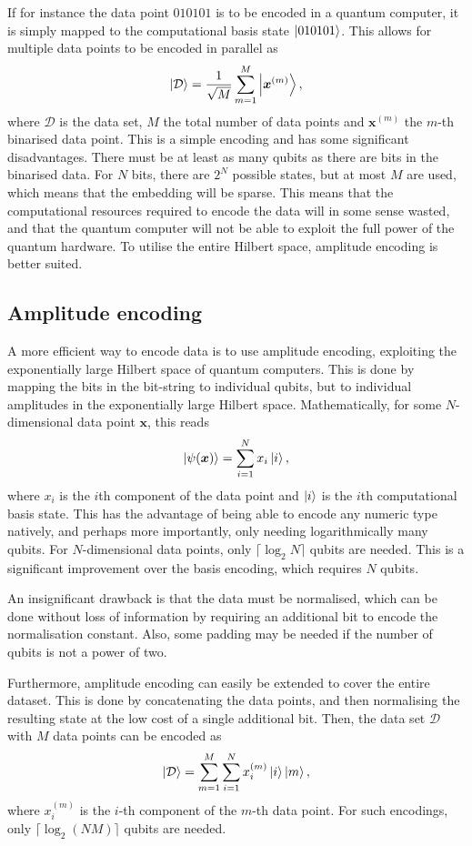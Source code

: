 If for instance the data point $010101$ is to be encoded in a quantum computer, it is simply mapped to the computational basis state $\ket{010101}$. This allows for multiple data points to be encoded in parallel as
\begin{equation}
    \ket{\mathcal{D}} = \frac{1}{\sqrt M} \sum_{m=1}^M \ket{\bm{x}^{(m)}},
\end{equation}
where $\mathcal{D}$ is the data set, $M$ the total number of data points and $\bm{x}^{(m)}$ the $m$-th binarised data point. This is a simple encoding and has some significant disadvantages. There must be at least as many qubits as there are bits in the binarised data. For $N$ bits, there are $2^N$ possible states, but at most $M$ are used, which means that the embedding will be sparse. This means that the computational resources required to encode the data will in some sense wasted, and that the quantum computer will not be able to exploit the full power of the quantum hardware. To utilise the entire Hilbert space, amplitude encoding is better suited.

\subsection{Amplitude encoding}
A more efficient way to encode data is to use amplitude encoding, exploiting the exponentially large Hilbert space of quantum computers. This is done by mapping the bits in the bit-string to individual qubits, but to individual amplitudes in the exponentially large Hilbert space. Mathematically, for some $N$-dimensional data point $\bm{x}$, this reads
\begin{equation}
    \ket{\psi(\bm{x})} = \sum_{i=1}^{N} x_i \ket{i},
\end{equation}
where $x_i$ is the $i$th component of the data point and $\ket{i}$ is the $i$th computational basis state. This has the advantage of being able to encode any numeric type natively, and perhaps more importantly, only needing logarithmically many qubits. For $N$-dimensional data points, only $\lceil \log_2 N \rceil$ qubits are needed. This is a significant improvement over the basis encoding, which requires $N$ qubits.

An insignificant drawback is that the data must be normalised, which can be done without loss of information by requiring an additional bit to encode the normalisation constant. Also, some padding may be needed if the number of qubits is not a power of two.

Furthermore, amplitude encoding can easily be extended to cover the entire dataset. This is done by concatenating the data points, and then normalising the resulting state at the low cost of a single additional bit. Then, the data set $\mathcal{D}$ with $M$ data points can be encoded as
\begin{equation}
    \ket{\mathcal{D}} = \sum_{m=1}^M \sum_{i=1}^{N} x_i^{(m)} \ket{i} \ket{m},
\end{equation}
where $x_i^{(m)}$ is the $i$-th component of the $m$-th data point. For such encodings, only $\lceil \log_2 (N M) \rceil$ qubits are needed.

